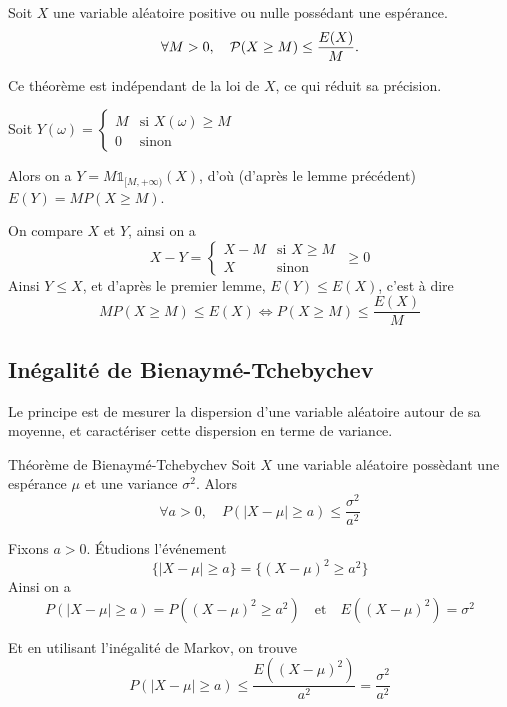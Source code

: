 \documentclass[a4paper, 12pt]{article}
\begin{document}
\begin{theoreme}{}{}
    Soit $X$ une variable aléatoire positive ou nulle possédant une espérance.
    $$
    \forall M > 0, \quad \P(X \geq M) \leq \frac{E(X)}{M}.
    $$ 
\end{theoreme}

\begin{remarque}
    Ce théorème est indépendant de la loi de $X$, ce qui réduit sa précision.
\end{remarque}

\begin{demonstration}
    Soit $Y(\omega) = \begin{cases}
        M & \text{si } X(\omega) \geq M \\
        0 & \text{sinon}
    \end{cases}$

    Alors on a $Y = M \mathds{1}_{[M, +\infty)}(X)$, d'où (d'après le lemme précédent) $E(Y) = M P(X \geq M)$.

    On compare $X$ et $Y$, ainsi on a
    $$
    X - Y = \begin{cases}
        X - M & \text{si } X \geq M \\
        X & \text{sinon}
    \end{cases} \; \geq 0
    $$
    Ainsi $Y \leq X$, et d'après le premier lemme, $E(Y) \leq E(X)$, c'est à dire
    $$
    M P(X \geq M) \leq E(X) \iff P(X \geq M) \leq \frac{E(X)}{M}
    $$
\end{demonstration}

\subsection{Inégalité de Bienaymé-Tchebychev}

Le principe est de
mesurer la dispersion d'une variable aléatoire autour de sa moyenne, et caractériser cette dispersion en terme de variance.

\begin{theoreme}{Théorème de Bienaymé-Tchebychev}{}
    Soit $X$ une variable aléatoire possèdant une espérance $\mu$ et une variance $\sigma^2$. Alors
    $$
    \forall a > 0, \quad P(|X - \mu| \geq a) \leq \frac{\sigma^2}{a^2}
    $$
\end{theoreme}

\begin{demonstration}
    Fixons $a > 0$.
    Étudions l'événement
    $$
    \{|X - \mu| \geq a\} = \{(X - \mu)^2 \geq a^2\}
    $$
    Ainsi on a
    $$
    P(|X - \mu| \geq a) = P((X - \mu)^2 \geq a^2) \quad \text{et} \quad E((X - \mu)^2) = \sigma^2
    $$

    Et en utilisant l'inégalité de Markov, on trouve
    $$
    P(|X - \mu| \geq a) \leq \frac{E((X - \mu)^2)}{a^2} = \frac{\sigma^2}{a^2}
    $$
\end{demonstration}
\end{document}
